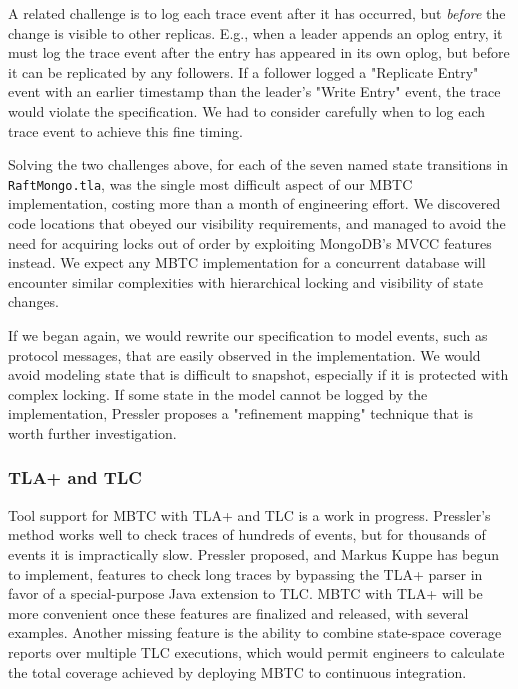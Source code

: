 \documentclass{vldb}
\begin{document}
A related challenge is to log each trace event after it has occurred, but \textit{before} the change is visible to other replicas. E.g., when a leader appends an oplog entry, it must log the trace event after the entry has appeared in its own oplog, but before it can be replicated by any followers. If a follower logged a "Replicate Entry" event with an earlier timestamp than the leader's "Write Entry" event, the trace would violate the specification. We had to consider carefully when to log each trace event to achieve this fine timing.

Solving the two challenges above, for each of the seven named state transitions in \texttt{RaftMongo.tla}, was the single most difficult aspect of our MBTC implementation, costing more than a month of engineering effort. We discovered code locations that obeyed our visibility requirements, and managed to avoid the need for acquiring locks out of order by exploiting MongoDB's MVCC features instead. We expect any MBTC implementation for a concurrent database will encounter similar complexities with hierarchical locking and visibility of state changes.

If we began again, we would rewrite our specification to model events, such as protocol messages, that are easily observed in the implementation. We would avoid modeling state that is difficult to snapshot, especially if it is protected with complex locking. If some state in the model cannot be logged by the implementation, Pressler proposes a "refinement mapping" technique\cite{Pressler18VerifyingSoftwareTracesTLAPlus} that is worth further investigation.

\subsubsection{TLA+ and TLC}

Tool support for MBTC with TLA+ and TLC is a work in progress. Pressler's method works well to check traces of hundreds of events, but for thousands of events it is impractically slow. Pressler proposed, and Markus Kuppe has begun to implement, features to check long traces by bypassing the TLA+ parser in favor of a special-purpose Java extension to TLC. MBTC with TLA+ will be more convenient once these features are finalized and released, with several examples. Another missing feature is the ability to combine state-space coverage reports over multiple TLC executions, which would permit engineers to calculate the total coverage achieved by deploying MBTC to continuous integration.
\end{document}
